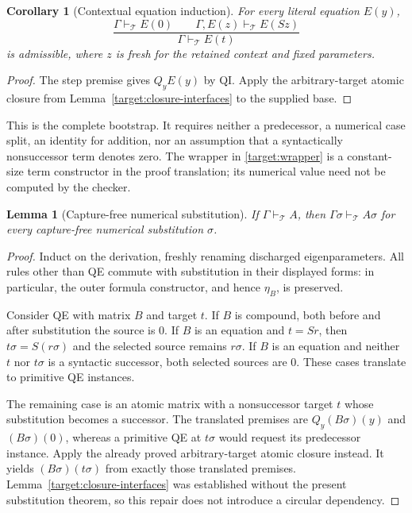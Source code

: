 \documentclass[11pt,a4paper]{article}
\newtheorem{lemma}[theorem]{Lemma}
\newtheorem{corollary}[theorem]{Corollary}
\theoremstyle{definition}\newtheorem{definition}[theorem]{Definition}
\begin{document}
\begin{corollary}[Contextual equation induction]
\label{target:equation-induction}
For every literal equation $E(y)$,
\[
 \frac{\Gamma\vdash_{\mathcal T}E(0)
       \qquad\Gamma,E(z)\vdash_{\mathcal T}E(Sz)}
      {\Gamma\vdash_{\mathcal T}E(t)}
\]
is admissible, where $z$ is fresh for the retained context and fixed
parameters.
\end{corollary}
\begin{proof}
The step premise gives $Q_yE(y)$ by QI.  Apply the arbitrary-target atomic
closure from Lemma~\ref{target:closure-interfaces} to the supplied base.
\end{proof}

This is the complete bootstrap.  It requires neither a predecessor, a
numerical case split, an identity for addition, nor an assumption that a
syntactically nonsuccessor term denotes zero.  The wrapper in
\eqref{target:wrapper} is a constant-size term constructor in the proof
translation; its numerical value need not be computed by the checker.

\begin{lemma}[Capture-free numerical substitution]
\label{target:substitution}
If $\Gamma\vdash_{\mathcal T}A$, then
$\Gamma\sigma\vdash_{\mathcal T}A\sigma$ for every capture-free numerical
substitution $\sigma$.
\end{lemma}
\begin{proof}
Induct on the derivation, freshly renaming discharged eigenparameters.
All rules other than QE commute with substitution in their displayed forms:
in particular, the outer formula constructor, and hence $\eta_B$, is
preserved.

Consider QE with matrix $B$ and target $t$.  If $B$ is compound, both before
and after substitution the source is $0$.  If $B$ is an equation and
$t=Sr$, then $t\sigma=S(r\sigma)$ and the selected source remains
$r\sigma$.  If $B$ is an equation and neither $t$ nor $t\sigma$ is a
syntactic successor, both selected sources are $0$.  These cases translate
to primitive QE instances.

The remaining case is an atomic matrix with a nonsuccessor target $t$
whose substitution becomes a successor.  The translated premises are
$Q_y(B\sigma)(y)$ and $(B\sigma)(0)$, whereas a primitive QE at $t\sigma$
would request its predecessor instance.  Apply the already proved
arbitrary-target atomic closure instead.  It yields $(B\sigma)(t\sigma)$
from exactly those translated premises.  Lemma~\ref{target:closure-interfaces}
was established without the present substitution theorem, so this repair
does not introduce a circular dependency.
\end{proof}
\end{document}
